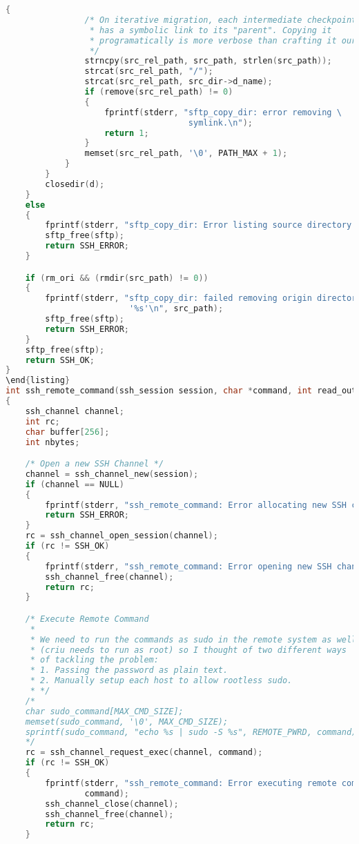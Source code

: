 \begin{lstlisting}[language=C,caption={Signature and schematic implementation of remote execution methods.\label{code:libssh}}]
            {
                /* On iterative migration, each intermediate checkpoint dir
                 * has a symbolic link to its "parent". Copying it
                 * programatically is more verbose than crafting it ourselves.
                 */
                strncpy(src_rel_path, src_path, strlen(src_path));
                strcat(src_rel_path, "/");
                strcat(src_rel_path, src_dir->d_name);
                if (remove(src_rel_path) != 0)
                {
                    fprintf(stderr, "sftp_copy_dir: error removing \
                                     symlink.\n");
                    return 1;
                }
                memset(src_rel_path, '\0', PATH_MAX + 1);
            }
        }
        closedir(d);
    }
    else
    {
        fprintf(stderr, "sftp_copy_dir: Error listing source directory!\n");
        sftp_free(sftp);
        return SSH_ERROR;
    }

    if (rm_ori && (rmdir(src_path) != 0))
    {
        fprintf(stderr, "sftp_copy_dir: failed removing origin directory \
                         '%s'\n", src_path);
        sftp_free(sftp);
        return SSH_ERROR;
    }
    sftp_free(sftp);
    return SSH_OK;
}
\end{listing}
int ssh_remote_command(ssh_session session, char *command, int read_output)
{
    ssh_channel channel;
    int rc;
    char buffer[256];
    int nbytes;

    /* Open a new SSH Channel */
    channel = ssh_channel_new(session);
    if (channel == NULL)
    {
        fprintf(stderr, "ssh_remote_command: Error allocating new SSH channel.\n");
        return SSH_ERROR;
    }
    rc = ssh_channel_open_session(channel);
    if (rc != SSH_OK)
    {
        fprintf(stderr, "ssh_remote_command: Error opening new SSH channel.\n");
        ssh_channel_free(channel);
        return rc;
    }

    /* Execute Remote Command 
     *
     * We need to run the commands as sudo in the remote system as well
     * (criu needs to run as root) so I thought of two different ways
     * of tackling the problem:
     * 1. Passing the password as plain text.
     * 2. Manually setup each host to allow rootless sudo.
     * */
    /*
    char sudo_command[MAX_CMD_SIZE];
    memset(sudo_command, '\0', MAX_CMD_SIZE);
    sprintf(sudo_command, "echo %s | sudo -S %s", REMOTE_PWRD, command);
    */
    rc = ssh_channel_request_exec(channel, command);
    if (rc != SSH_OK)
    {
        fprintf(stderr, "ssh_remote_command: Error executing remote command: %s\n",
                command);
        ssh_channel_close(channel);
        ssh_channel_free(channel);
        return rc;
    }


\end{lstlisting}
